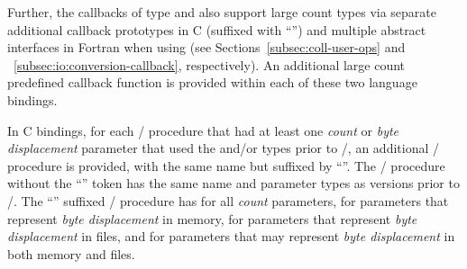 Further, the callbacks of type
 and\flushline
{} also support large count
types via separate additional callback prototypes in C (suffixed with
``'') and multiple abstract interfaces in Fortran when using
 (see Sections~\ref{subsec:coll-user-ops} and
~\ref{subsec:io:conversion-callback}, respectively).
An additional large count predefined callback function
is provided within each of these two language bindings.

In C bindings,
for each \MPI/ procedure that had at least one
\emph{count} or \emph{byte displacement} parameter
that used the  and/or  types prior to \MPIIVDOTO/,
an additional \MPI/ procedure is provided,
with the same name but suffixed by ``''.
The \MPI/ procedure without the ``'' token has
the same name and parameter types as versions prior to \MPIIVDOTO/.
%
The ``'' suffixed \MPI/ procedure has
 for all \emph{count} parameters,
 for parameters that represent \emph{byte displacement} in memory,
 for parameters that represent \emph{byte displacement} in files,
and
 for parameters that may represent \emph{byte displacement} in both memory and files.

